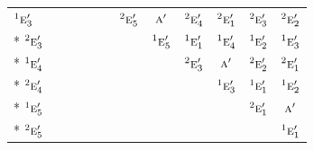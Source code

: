 \documentclass[10pt,a4paper]{article}
\numberwithin{equation}{section}
\newcommand{\irr}[1]{\text{\normalfont\scshape #1}}
\newcommand{\conjpair}[1]{{}^{#1}}
\begin{document}
{\begin{longtable}{@{}lccccccccccc@{}}
$\conjpair{1}\irr{e}_{3}'$ &  &  &  &  &  & $\conjpair{2}\irr{e}_{5}'$ & $\irr{a}'$ & $\conjpair{2}\irr{e}_{4}'$ & $\conjpair{2}\irr{e}_{1}'$ & $\conjpair{2}\irr{e}_{3}'$ & $\conjpair{2}\irr{e}_{2}'$\\*
$\conjpair{2}\irr{e}_{3}'$ &  &  &  &  &  &  & $\conjpair{1}\irr{e}_{5}'$ & $\conjpair{1}\irr{e}_{1}'$ & $\conjpair{1}\irr{e}_{4}'$ & $\conjpair{1}\irr{e}_{2}'$ & $\conjpair{1}\irr{e}_{3}'$\\*
$\conjpair{1}\irr{e}_{4}'$ &  &  &  &  &  &  &  & $\conjpair{2}\irr{e}_{3}'$ & $\irr{a}'$ & $\conjpair{2}\irr{e}_{2}'$ & $\conjpair{2}\irr{e}_{1}'$\\*
$\conjpair{2}\irr{e}_{4}'$ &  &  &  &  &  &  &  &  & $\conjpair{1}\irr{e}_{3}'$ & $\conjpair{1}\irr{e}_{1}'$ & $\conjpair{1}\irr{e}_{2}'$\\*
$\conjpair{1}\irr{e}_{5}'$ &  &  &  &  &  &  &  &  &  & $\conjpair{2}\irr{e}_{1}'$ & $\irr{a}'$\\*
$\conjpair{2}\irr{e}_{5}'$ &  &  &  &  &  &  &  &  &  &  & $\conjpair{1}\irr{e}_{1}'$\\
\bottomrule\end{longtable}}
\end{document}
